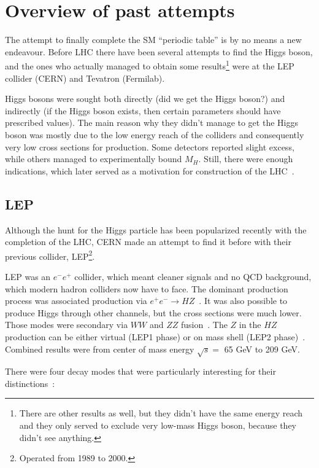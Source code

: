 \section{Overview of past attempts}

The attempt to finally complete the SM ``periodic table'' is by no means a new endeavour. Before LHC there have been several attempts
to find the Higgs boson, and the ones who actually managed to obtain some results\footnote{There are other results as well, but they didn't
have the same energy reach and they only served to exclude very low-mass Higgs boson, because they didn't see anything.} were at the LEP
collider (CERN) and Tevatron (Fermilab).

Higgs bosons were sought both directly (did we get the Higgs boson?) and indirectly (if the Higgs boson exists, then certain parameters should
have prescribed values). The main reason why they didn't manage to get the Higgs boson was mostly due to the low energy reach of
the colliders and consequently very low cross sections for production. Some detectors reported slight excess, while others managed to experimentally
bound $M_H$. Still, there were enough indications, which later served as a motivation for construction of the LHC~\cite{elena:green}.

\subsection{LEP}

Although the hunt for the Higgs particle has been popularized recently with the completion of the LHC, CERN made an attempt to find it
before with their previous collider, LEP\footnote{Operated from 1989 to 2000.}.

LEP was an $e^-e^+$ collider, which meant cleaner signals and no QCD background, which modern hadron colliders now have to face. The
dominant production process was associated production via $e^+e^-\to HZ$~\cite{higgs:review}.
It was also possible to produce Higgs through other channels, but the cross sections were much lower. Those modes were secondary via
$WW$ and $ZZ$ fusion~\cite{higgs:review}. The $Z$ in the $HZ$ production can be either virtual (LEP1 phase) or on mass shell
(LEP2 phase)~\cite{higgs:review}. Combined results were from center of mass energy $\sqrt{s} =$ 65 GeV to 209 GeV.

There were four decay modes that were particularly interesting for their distinctions~\cite{higgs:review}:

